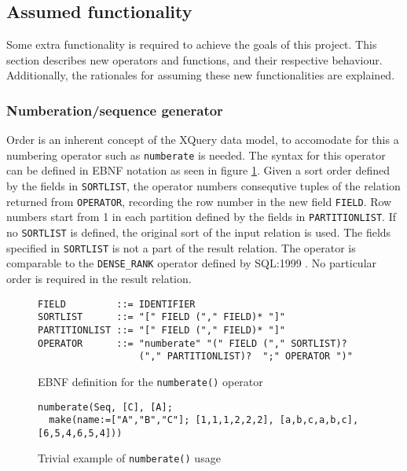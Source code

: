 \subsection{Assumed functionality}
\label{sect:method:marsAddedOperators}
Some extra functionality is required to achieve the goals of this project. This
section describes new operators and functions, and their respective behaviour.
Additionally, the rationales for assuming these new functionalities are
explained.

\subsubsection{Numberation/sequence generator}
Order is an inherent concept of the XQuery data model, to accomodate for this a numbering operator such as
\texttt{numberate} is needed. The syntax for this operator can be defined in EBNF notation as seen in figure
\ref{figure:mql:numberate_ebnf}. Given a sort order defined by the fields in \texttt{SORTLIST}, the operator
numbers consequtive tuples of the relation returned from \texttt{OPERATOR}, recording the row number in the new
field \texttt{FIELD}. Row numbers start from 1 in each partition defined by the fields in \texttt{PARTITIONLIST}.
If no \texttt{SORTLIST} is defined, the original sort of the input relation is used. The fields specified in
\texttt{SORTLIST} is not a part of the result relation. The operator is comparable to the \texttt{DENSE\_RANK}
operator defined by SQL:1999 \cite{sqlbook}. No particular order is required in the result relation.

\begin{figure}[!h]
\begin{center}
\begin{Verbatim}
FIELD         ::= IDENTIFIER
SORTLIST      ::= "[" FIELD ("," FIELD)* "]"
PARTITIONLIST ::= "[" FIELD ("," FIELD)* "]"
OPERATOR      ::= "numberate" "(" FIELD ("," SORTLIST)? 
                  ("," PARTITIONLIST)?  ";" OPERATOR ")"
\end{Verbatim}
  \caption{EBNF definition for the \texttt{numberate()} operator}
  \label{figure:mql:numberate_ebnf}
\end{center}
\end{figure}

\begin{figure}[!h]
\begin{center}
\begin{Verbatim}
numberate(Seq, [C], [A];
  make(name:=["A","B","C"]; [1,1,1,2,2,2], [a,b,c,a,b,c],[6,5,4,6,5,4]))
\end{Verbatim}
  \caption{Trivial example of \texttt{numberate()} usage}
  \label{figure:mql:numberate_example}
\end{center}
\end{figure}

